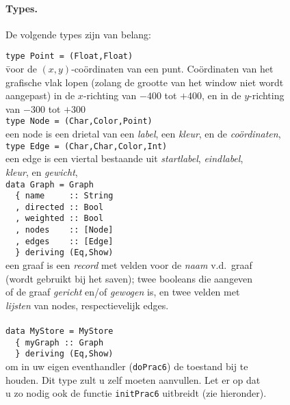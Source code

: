\documentclass[11pt]{article}
\begin{document}
\paragraph{Types.}
De volgende types zijn van belang:
\begin{tabbing}
  \hspace{1em}
    \= \verb!type Point = (Float,Float)!				\\
    \> \hspace{3em}
       \= voor de $(x,y)$-co\"ordinaten van een punt.		
          Co\"ordinaten van het					\\
    \> \> grafische vlak lopen (zolang de grootte van het window niet wordt \\ 
    \> \> aangepast) in de $x$-richting van $-400$ tot $+400$, en in de $y$-richting \\
    \> \> van $-300$ tot $+300$						\\[1ex]
    \> \verb!type Node = (Char,Color,Point)!			\\
    \> \> een node is een drietal van een {\em label\/}, een {\em kleur\/}, en de {\em co\"ordinaten\/},				\\[1ex]
    \> \verb!type Edge = (Char,Char,Color,Int)!			\\
    \> \> een edge is een viertal bestaande uit {\em startlabel\/},
       {\em eindlabel\/},					\\
    \> \> {\em kleur\/}, en {\em gewicht\/},			\\[1ex]
    \> \verb!data Graph = Graph! \\
    \> \verb!  { name     :: String!			\\
    \> \verb!  , directed :: Bool!			\\
    \> \verb!  , weighted :: Bool!			\\
    \> \verb!  , nodes    :: [Node]!		\\
    \> \verb!  , edges    :: [Edge]!		\\
    \> \verb!  } deriving (Eq,Show)!					\\
    \> \> een graaf is een {\em record\/} met velden voor de
          {\em naam\/} v.d.\ graaf				\\
    \> \> (wordt gebruikt bij het saven); twee booleans die
          aangeven						\\
    \> \> of de graaf {\em gericht\/} en/of {\em gewogen\/} is,
          en twee velden met					\\
    \> \> {\em lijsten\/} van nodes, respectievelijk edges. \\	\\[1ex]
    \> \verb!data MyStore = MyStore! \\
    \> \verb!  { myGraph :: Graph ! \\
    \> \verb!  } deriving (Eq,Show)!		\\
    \> \> om in uw eigen eventhandler (\verb!doPrac6!) de toestand bij te \\
    \> \>  houden. Dit type zult u zelf moeten aanvullen.
	  Let er op dat					\\
    \> \> u zo nodig ook de functie \verb!initPrac6! uitbreidt (zie hieronder).
\end{tabbing}
\end{document}
